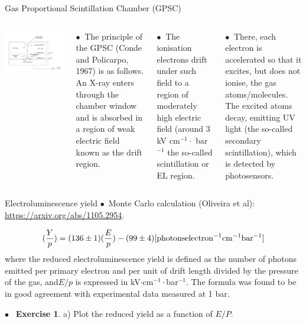 \documentclass [aspectratio=169]{beamer}
\begin{document}
\begin{frame}{Gas Proportional Scintillation Chamber (GPSC)}
\begin{columns}
\includegraphics[scale=0.24]{gsc.png}


$\bullet~$ The principle of the GPSC (Conde and Policarpo, 1967) is as follows. An X-ray enters through the chamber window and is absorbed in a region of weak electric field known as the drift region. 

$\bullet~$ The ionisation electrons drift under such field to a region
of moderately high electric field (around 3 kV cm$^{-1}\cdot$ bar$^{-1}$ the so-called scintillation or EL region. 

$\bullet~$ There, each electron is accelerated so that it excites, but does not ionise, the gas atoms/molecules. The excited
atoms decay, emitting UV light (the so-called secondary scintillation), which is detected by photosensors.
\end{columns}
\end{frame}

\begin{frame}{Electroluminescence yield}
$\bullet$~Monte Carlo calculation (Oliveira et al): \url{https://arxiv.org/abs/1105.2954}.

\[
(\frac{Y}{p})= (136 \pm 1) (\frac{E}{p}) - (99 \pm 4) {\rm [photons electron^{-1} cm^{-1} bar^{-1}]}
\]
where the reduced electroluminescence yield is defined as the number of photons emitted per primary
electron and per unit of drift length divided by the pressure of the gas, and$E/p$ is expressed in
kV$\cdot$cm$^{-1}\cdot$bar$^{-1}$. The formula was found to be in good agreement with experimental data measured at 1 bar. 

$\bullet$~ {\bf Exercise 1}. a) Plot the reduced yield as a function of $E/P$. 

\end{frame}
\end{document}
